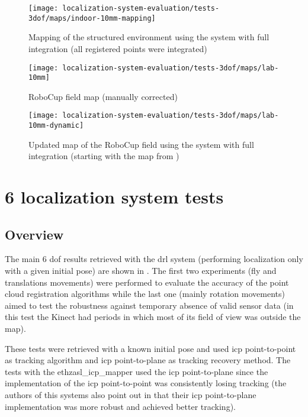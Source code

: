 \begin{figure}[H]
	\centering
	\texttt{[image: localization-system-evaluation/tests-3dof/maps/indoor-10mm-mapping]}
	\caption{Mapping of the structured environment using the  system with full integration (all registered points were integrated)}
	\label{fig:localization-system-evaluation_indoor-10mm-mapping}
\end{figure}

\begin{figure}[H]
	\centering
	\texttt{[image: localization-system-evaluation/tests-3dof/maps/lab-10mm]}
	\caption{RoboCup field map (manually corrected)}
	\label{fig:localization-system-evaluation_lab-10mm}
\end{figure}

\begin{figure}[H]
	\centering
	\texttt{[image: localization-system-evaluation/tests-3dof/maps/lab-10mm-dynamic]}
	\caption{Updated map of the RoboCup field using the  system with full integration (starting with the map from )}
	\label{fig:localization-system-evaluation_lab-10mm-dynamic}
\end{figure}




\section{6  localization system tests}\label{sec:tridimensional-localization-system-tests}

\subsection{Overview}

The main 6 \gls{dof} results retrieved with the \gls{drl} system (performing localization only with a given initial pose) are shown in . The first two experiments (fly and translations movements) were performed to evaluate the accuracy of the point cloud registration algorithms while the last one (mainly rotation movements) aimed to test the robustness against temporary absence of valid sensor data (in this test the Kinect had periods in which most of its field of view was outside the map).

These tests were retrieved with a known initial pose and used \gls{icp} point-to-point as tracking algorithm and \gls{icp} point-to-plane as tracking recovery method. The tests with the ethzasl\_icp\_mapper used the \gls{icp} point-to-plane since the implementation of the \gls{icp} point-to-point was consistently losing tracking (the authors of this systems also point out in \cite{Pomerleau2013a} that their \gls{icp} point-to-plane implementation was more robust and achieved better tracking).

